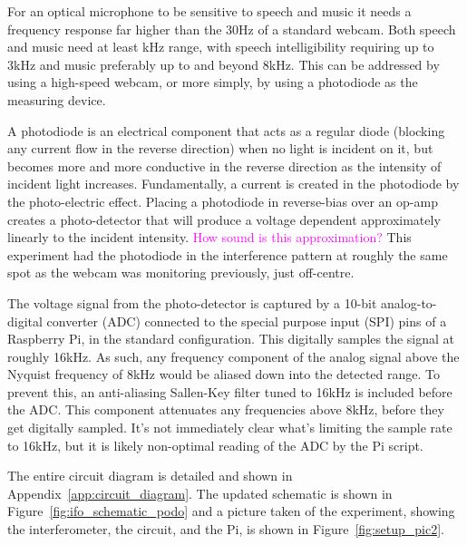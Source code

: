 \documentclass[prb,preprint]{revtex4-1}
\newcommand{\jam}{\textcolor{magenta}}
\begin{document}
For an optical microphone to be sensitive to speech and music it needs a frequency response far higher than the 30Hz of a standard webcam. Both speech and music need at least kHz range, with speech intelligibility requiring up to 3kHz and music preferably up to and beyond 8kHz. This can be addressed by using a high-speed webcam, or more simply, by using a photodiode as the measuring device.


A photodiode is an electrical component that acts as a regular diode (blocking any current flow in the reverse direction) when no light is incident on it, but becomes more and more conductive in the reverse direction as the intensity of incident light increases. 
Fundamentally, a current is created in the photodiode by the photo-electric effect. Placing a photodiode in reverse-bias over an op-amp creates a photo-detector that will produce a voltage dependent approximately linearly to the incident intensity. \jam{How sound is this approximation?} This experiment had the photodiode in the interference pattern at roughly the same spot as the webcam was monitoring previously, just off-centre.


The voltage signal from the photo-detector is captured by a 10-bit analog-to-digital converter (ADC) connected to the special purpose input (SPI) pins of a Raspberry Pi, in the standard configuration. This digitally samples the signal at roughly 16kHz. As such, any frequency component of the analog signal above the Nyquist frequency of 8kHz would be aliased down into the detected range.
To prevent this, an anti-aliasing Sallen-Key filter tuned to 16kHz is included before the ADC. This component attenuates any frequencies above 8kHz, before they get digitally sampled.
It’s not immediately clear what’s limiting the sample rate to 16kHz, but it is likely non-optimal reading of the ADC by the Pi script.


The entire circuit diagram is detailed and shown in Appendix~\ref{app:circuit_diagram}. The updated schematic is shown in Figure~\ref{fig:ifo_schematic_podo} and a picture taken of the experiment, showing the interferometer, the circuit, and the Pi, is shown in Figure~\ref{fig:setup_pic2}.
\end{document}
